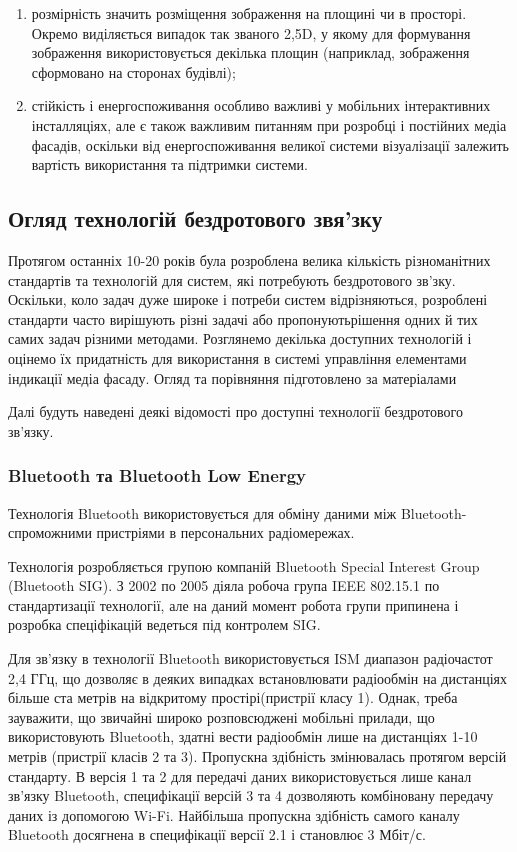 \documentclass[a4paper,ukrainian,utf8,nocolumnsxix,floatsection]{eskdtext}
\renewcommand\paragraph{\subsubsection}
\begin{document}
\begin{enumerate}
	\item розмірність значить розміщення зображення на площині чи в просторі. Окремо виділяється випадок так званого 2,5D, у якому для формування зображення використовується декілька площин (наприклад, зображення сформовано на сторонах будівлі);
	\item стійкість і енергоспоживання особливо важливі у мобільних інтерактивних інсталляціях, але є також важливим питанням при розробці і постійних медіа фасадів, оскільки від енергоспоживання великої системи візуалізації залежить вартість використання та підтримки системи.
\end{enumerate}


\subsection{Огляд технологій бездротового звя’зку}

Протягом останніх 10-20 років була розроблена велика кількість різноманітних стандартів та технологій для систем, які потребують бездротового зв’зку. Оскільки, коло задач дуже широке і потреби систем відрізняються, розроблені стандарти часто вирішують різні задачі або пропонуютьрішення одних й тих самих задач різними методами. Розглянемо декілька доступних технологій і оцінемо їх придатність для використання в системі управління елементами індикації медіа фасаду. Огляд та порівняння підготовлено за матеріалами


Далі будуть наведені деякі відомості про доступні технології бездротового зв’язку.

\paragraph{Bluetooth та Bluetooth Low Energy} %
\label{par:bluetooth_bluetooth_low_energy}

Технологія Bluetooth використовується для обміну даними між Bluetooth-спроможними пристріями в персональних радіомережах. 

Технологія розробляється групою компаній Bluetooth Special Interest Group (Bluetooth SIG). З 2002 по 2005 діяла робоча група IEEE 802.15.1 по стандартизації технології, але на даний момент робота групи припинена і розробка спеціфікацій ведеться під контролем SIG.

Для зв’язку в технології Bluetooth використовується ISM диапазон радіочастот 2,4 ГГц, що дозволяє в деяких випадках встановлювати радіообмін на дистанціях більше ста метрів на відкритому простірі(пристрії класу 1). Однак, треба зауважити, що звичайні широко розповсюджені мобільні прилади, що використовують Bluetooth, здатні вести радіообмін лише на дистанціях 1-10 метрів (пристрії класів 2 та 3). Пропускна здібність змінювалась протягом версій стандарту. В версія 1 та 2 для передачі даних використовується лише канал зв’язку Bluetooth, специфікації версій 3 та 4 дозволяють комбіновану передачу даних із допомогою Wi-Fi. Найбільша пропускна здібність самого каналу Bluetooth досягнена в специфікації версії 2.1 і становлює 3 Мбіт/с. 
\end{document}

